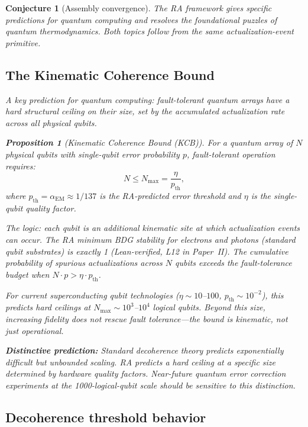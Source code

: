 \documentclass[11pt]{article}
\newtheorem{proposition}{Proposition}
\newtheorem{conjecture}{Conjecture}
\begin{document}
\begin{conjecture}[Assembly convergence]
The RA framework gives specific predictions for quantum computing and resolves the foundational puzzles of quantum thermodynamics. Both topics follow from the same actualization-event primitive.

\subsection{The Kinematic Coherence Bound}
\label{sec:kcb}

A key prediction for quantum computing: fault-tolerant quantum arrays have a hard structural ceiling on their size, set by the accumulated actualization rate across all physical qubits.

\begin{proposition}[Kinematic Coherence Bound (KCB)]
\label{prop:kcb}
For a quantum array of $N$ physical qubits with single-qubit error probability $p$, fault-tolerant operation requires:
\begin{equation}
N \leq N_{\max} = \frac{\eta}{p_{\mathrm{th}}},
\end{equation}
where $p_{\mathrm{th}} = \alpha_{\mathrm{EM}} \approx 1/137$ is the RA-predicted error threshold and $\eta$ is the single-qubit quality factor.
\end{proposition}

The logic: each qubit is an additional kinematic site at which actualization events can occur. The RA minimum BDG stability for electrons and photons (standard qubit substrates) is exactly 1 (Lean-verified, L12 in Paper~II). The cumulative probability of spurious actualizations across $N$ qubits exceeds the fault-tolerance budget when $N \cdot p > \eta \cdot p_{\mathrm{th}}$.

For current superconducting qubit technologies ($\eta \sim 10$--$100$, $p_{\mathrm{th}} \sim 10^{-2}$), this predicts hard ceilings at $N_{\max} \sim 10^3$--$10^4$ logical qubits. Beyond this size, increasing fidelity does not rescue fault tolerance---the bound is kinematic, not just operational.

\textbf{Distinctive prediction:} Standard decoherence theory predicts exponentially difficult but unbounded scaling. RA predicts a \emph{hard ceiling} at a specific size determined by hardware quality factors. Near-future quantum error correction experiments at the 1000-logical-qubit scale should be sensitive to this distinction.

\subsection{Decoherence threshold behavior}
\label{sec:threshold_decoherence}


\end{conjecture}
\end{document}
